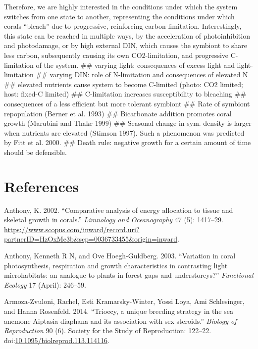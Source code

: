 \documentclass[]{elsarticle} %
\begin{document}
Therefore, we are highly interested in the conditions under which the
system switches from one state to another, representing the conditions
under which corals ``bleach'' due to progressive, reinforcing
carbon-limitation. Interestingly, this state can be reached in multiple
ways, by the acceleration of photoinhibition and photodamage, or by high
external DIN, which causes the symbiont to share less carbon,
subsequently causing its own CO2-limitation, and progressive
C-limitation of the system. \#\# varying light: consequences of excess
light and light-limitation \#\# varying DIN: role of N-limitation and
consequences of elevated N \#\# elevated nutrients cause system to
become C-limited (photo: CO2 limited; host: fixed-C limited) \#\#
C-limitation increases susceptibility to bleaching \#\# consequences of
a less efficient but more tolerant symbiont \#\# Rate of symbiont
repopulation (Berner et al. 1993) \#\# Bicarbonate addition promotes
coral growth (Marubini and Thake 1999) \#\# Seasonal change in sym.
density is larger when nutrients are elevated (Stimson 1997). Such a
phenomenon was predicted by Fitt et al. 2000. \#\# Death rule: negative
growth for a certain amount of time should be defensible.

\section*{References}\label{references}

\hypertarget{refs}{}
\hypertarget{ref-Anthony:2002tc}{}
Anthony, K. 2002. ``Comparative analysis of energy allocation to tissue
and skeletal growth in corals.'' \emph{Limnology and Oceanography} 47
(5): 1417--29.
\url{https://www.scopus.com/inward/record.uri?partnerID=HzOxMe3b\&scp=0036733455\&origin=inward}.

\hypertarget{ref-Anthony:2003p3632}{}
Anthony, Kenneth R N, and Ove Hoegh-Guldberg. 2003. ``Variation in coral
photosynthesis, respiration and growth characteristics in contrasting
light microhabitats: an analogue to plants in forest gaps and
understoreys?'' \emph{Functional Ecology} 17 (April): 246--59.

\hypertarget{ref-ArmozaZvuloni:2014ju}{}
Armoza-Zvuloni, Rachel, Esti Kramarsky-Winter, Yossi Loya, Ami
Schlesinger, and Hanna Rosenfeld. 2014. ``Trioecy, a unique breeding
strategy in the sea anemone Aiptasia diaphana and its association with
sex steroids.'' \emph{Biology of Reproduction} 90 (6). Society for the
Study of Reproduction: 122--22.
doi:\href{https://doi.org/10.1095/biolreprod.113.114116}{10.1095/biolreprod.113.114116}.
\end{document}

